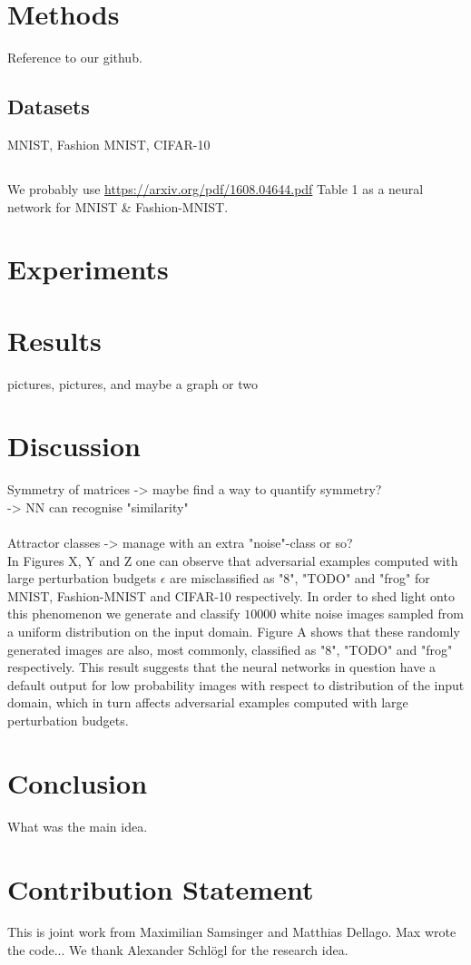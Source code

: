 \documentclass{article}
\begin{document}
\section{Methods}

Reference to our github.

\subsection{Datasets}
MNIST, Fashion MNIST, CIFAR-10

\subsection{}
We probably use \url{https://arxiv.org/pdf/1608.04644.pdf} Table 1 as a neural network for MNIST \& Fashion-MNIST.

\section{Experiments}
\label{experiments}

\section{Results}
pictures, pictures, and maybe a graph or two


\section{Discussion}

Symmetry of matrices -> maybe find a way to quantify symmetry?\\
-> NN can recognise "similarity"\\
\\

Attractor classes -> manage with an extra "noise"-class or so?\\


In Figures X, Y and Z one can observe that adversarial examples computed with large perturbation budgets $\epsilon$ are misclassified as "8", "TODO" and "frog" for MNIST, Fashion-MNIST and CIFAR-10 respectively. In order to shed light onto this phenomenon we generate and classify $10000$ white noise images sampled from a uniform distribution on the input domain. Figure A shows that these randomly generated images are also, most commonly, classified as "8", "TODO" and "frog" respectively. This result suggests that the neural networks in question have a default output for low probability images with respect to distribution of the input domain, which in turn affects adversarial examples computed with large perturbation budgets.

\section{Conclusion}
What was the main idea.

\section{Contribution Statement}

This is joint work from Maximilian Samsinger and Matthias Dellago. Max wrote the code...
We thank Alexander Schlögl for the research idea.


\end{document}
